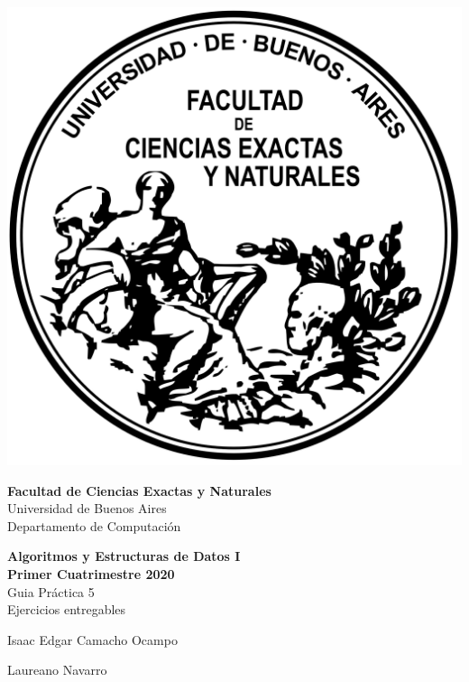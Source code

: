 \documentclass[12pt]{book}
\begin{document}
\thispagestyle{empty}

\begin {center}

\includegraphics[scale=.4]{Logo-fcenuba.png}

\medskip
\textbf{Facultad de Ciencias Exactas y Naturales}
\\
Universidad de Buenos Aires
\\
Departamento de Computación

\vspace{3cm}


\textbf{\large Algoritmos y Estructuras de Datos I}\\
\textbf{Primer Cuatrimestre 2020}
\\    Guia Pr\'actica 5
\\ Ejercicios entregables
\vspace{2cm}




\end {center}


\vspace{2.5cm}

\noindent Isaac Edgar Camacho Ocampo
 
\noindent Laureano Navarro

\vspace{1cm}
\end{document}
